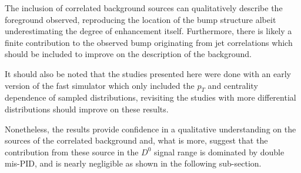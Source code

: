 The inclusion of correlated background sources can qualitatively describe the foreground observed, reproducing the location of the bump structure albeit underestimating the degree of enhancement itself. Furthermore, there is likely a finite contribution to the observed bump originating from jet correlations which should be included to improve on the description of the background.

It should also be noted that the studies presented here were done with an early version of the fast simulator which only included the $p_T$ and centrality dependence of sampled distributions, revisiting the studies with more differential distributions should improve on these results.

Nonetheless, the results provide confidence in a qualitative understanding on the sources of the correlated background and, what is more, suggest that the contribution from these source in the $D^0$ signal range is dominated by double mis-PID, and is nearly negligible as shown in the following sub-section.

